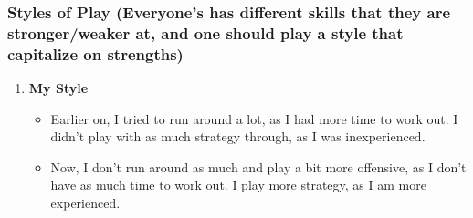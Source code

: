 \begin{frame} 
\frametitle{ Styles of Play (Everyone's has different skills that they are stronger/weaker at, and one should play a style that capitalize on strengths)  }

\begin{enumerate} 

\item \small \textbf{My Style} 
\begin{itemize}
\item \tiny Earlier on, I tried to run around a lot, as I had more time to work out. I didn't play with as much strategy through, as I was inexperienced. 
\item \tiny Now, I don't run around as much and play a  bit more offensive, as I don't have as much time to work out. I  play more strategy, as I am more experienced.  
\end{itemize} 
\end{enumerate}
\end{frame} 

